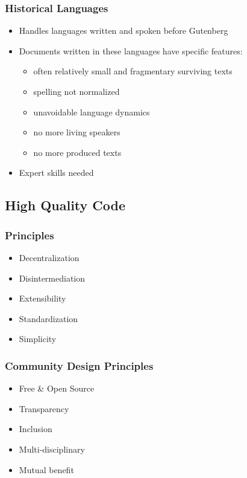 \documentclass{beamer}
\begin{document}
\begin{frame}
\frametitle{Historical Languages}
\begin{itemize}
    \item Handles languages written and spoken before Gutenberg
    \item Documents written in these languages have specific features:   
    \begin{itemize}
        \item often relatively small and fragmentary surviving texts
        \item spelling not normalized
        \item unavoidable language dynamics  
        \item no more living speakers
        \item no more produced texts
        
    \end{itemize}
    \item Expert skills needed
\end{itemize}
\end{frame}


\subsection{High Quality Code}

\begin{frame}
\frametitle{Principles}
\begin{itemize}
    \item Decentralization
    \item Disintermediation
    \item Extensibility
    \item Standardization
    \item Simplicity
\end{itemize}{}
    
\end{frame}


\begin{frame}
\frametitle{Community Design Principles}
\begin{itemize}
    \item Free \& Open Source
    \item Transparency
    \item Inclusion
    \item Multi-disciplinary
    \item Mutual benefit
\end{itemize}
\end{frame}
\end{document}

